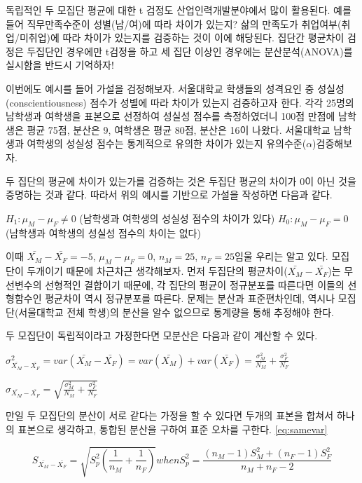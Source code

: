 \documentclass[
]{book}
\begin{document}
독립적인 두 모집단 평균에 대한 t 검정도 산업인력개발분야에서 많이 활용된다. 예를 들어 직무만족수준이 성별(남/여)에 따라 차이가 있는지? 삶의 만족도가 취업여부(취업/미취업)에 따라 차이가 있는지를 검증하는 것이 이에 해당된다. 집단간 평균차이 검정은 두집단인 경우에만 t검정을 하고 세 집단 이상인 경우에는 분산분석(ANOVA)를 실시함을 반드시 기억하자!

이번에도 예시를 들어 가설을 검정해보자. 서울대학교 학생들의 성격요인 중 성실성(conscientiousness) 점수가 성별에 따라 차이가 있는지 검증하고자 한다. 각각 25명의 남학생과 여학생을 표본으로 선정하여 성실성 점수를 측정하였더니 100점 만점에 남학생은 평균 75점, 분산은 9, 여학생은 평균 80점, 분산은 16이 나왔다. 서울대학교 남학생과 여학생의 성실성 점수는 통계적으로 유의한 차이가 있는지 유의수준(\(\alpha\))검증해보자.

두 집단의 평균에 차이가 있는가를 검증하는 것은 두집단 평균의 차이가 0이 아닌 것을 증명하는 것과 같다. 따라서 위의 예시를 기반으로 가설을 작성하면 다음과 같다.

\(H_1: \mu_{M}-\mu_{F}\neq0\) (남학생과 여학생의 성실성 점수의 차이가 있다)
\(H_0: \mu_{M}-\mu_{F}=0\) (남학생과 여학생의 성실성 점수의 차이는 없다)

이때 \(\bar{X_{M}}-\bar{X_{F}}=-5\), \(\mu_{M}-\mu_{F}=0\), \(n_{M}=25\), \(n_{F}=25\)임울 우리는 알고 있다. 모집단이 두개이기 때문에 차근차근 생각해보자. 먼저 두집단의 평균차이(\(\bar{X_{M}}-\bar{X_{F}}\))는 무선변수의 선형적인 결합이기 때문에, 각 집단의 평균이 정규분포를 따른다면 이들의 선형함수인 평균차이 역시 정규분포를 따른다. 문제는 분산과 표준편차인데, 역시나 모집단(서울대학교 전체 학생)의 분산을 알수 없으므로 통계량을 통해 추정해야 한다.

두 모집단이 독립적이라고 가정한다면 모분산은 다음과 같이 계산할 수 있다.

\(\sigma^2_{\bar{X_{M}}-\bar{X_{F}}}= var(\bar{X_{M}}-\bar{X_{F}})=var(\bar{X_{M}})+var(\bar{X_{F}})=\frac{\sigma^2_{M}}{N_{M}}+\frac{\sigma^2_{F}}{N_{F}}\)

\(\sigma_{\bar{X_{M}}-\bar{X_{F}}}= \sqrt{\frac{\sigma^2_{M}}{N_{M}}+\frac{\sigma^2_{F}}{N_{F}}}\)

만일 두 모집단의 분산이 서로 같다는 가정을 할 수 있다면 두개의 표본을 합쳐서 하나의 표본으로 생각하고, 통합된 분산을 구하여 표준 오차를 구한다. \eqref{eq:samevar}

\begin{equation}
S_{\bar{X_{M}}-\bar{X_{F}}}= \sqrt{S^2_{p}(\frac{1}{n_M}+\frac{1}{n_F})}
when
S^2_{p}=\frac{(n_{M}-1)S^2_{M}+(n_{F}-1)S^2_{F}}{{n_M}+{n_F}-2}
\label{eq:samevar}
\end{equation}
\end{document}
